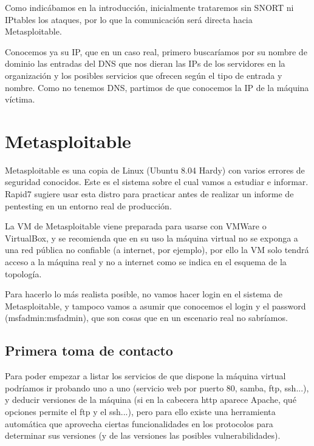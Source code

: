\documentclass[a4paper,12pt]{scrartcl}
\begin{document}
Como indicábamos en la introducción, inicialmente trataremos sin SNORT ni IPtables los ataques, por lo que la comunicación será directa hacia Metasploitable.

Conocemos ya su IP, que en un caso real, primero buscaríamos por su nombre de dominio las entradas del DNS que nos dieran las IPs de los servidores en la organización y los posibles servicios que ofrecen según el tipo de entrada y nombre. Como no tenemos DNS, partimos de que conocemos la IP de la máquina víctima.


\section{Metasploitable}

Metasploitable es una copia de Linux (Ubuntu 8.04 Hardy) con varios errores de seguridad conocidos. Este es el sistema sobre el cual vamos a estudiar e informar. Rapid7 sugiere usar esta distro para practicar antes de realizar un informe de pentesting en un entorno real de producción\cite{metasploitable}.

\vspace{10pt}

La VM de Metasploitable viene preparada para usarse con VMWare o VirtualBox, y se recomienda que en su uso la máquina virtual no se exponga a una red pública no confiable (a internet, por ejemplo), por ello la VM solo tendrá acceso a la máquina real y no a internet como se indica en el esquema de la topología.

\vspace{10pt}

Para hacerlo lo más realista posible, no vamos hacer login en el sistema de Metasploitable, y tampoco vamos a asumir que conocemos el login y el password (msfadmin:msfadmin), que son cosas que en un escenario real no sabríamos.


\subsection{Primera toma de contacto}

Para poder empezar a listar los servicios de que dispone la máquina virtual podríamos ir probando uno a uno (servicio web por puerto 80, samba, ftp, ssh...), y deducir versiones de la máquina (si en la cabecera http aparece Apache, qué opciones permite el ftp y el ssh...), pero para ello existe una herramienta automática que aprovecha ciertas funcionalidades en los protocolos para determinar sus versiones (y de las versiones las posibles vulnerabilidades).
\end{document}
